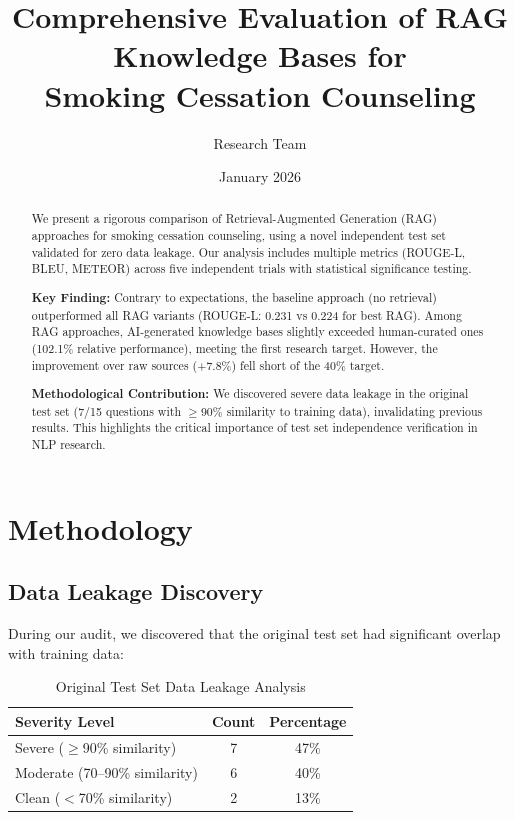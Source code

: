 \documentclass{article}
\title{Comprehensive Evaluation of RAG Knowledge Bases for\\Smoking Cessation Counseling}
\author{Research Team}
\date{January 2026}
\begin{document}
\maketitle

\begin{abstract}
We present a rigorous comparison of Retrieval-Augmented Generation (RAG) approaches for smoking cessation counseling, using a novel independent test set validated for zero data leakage. Our analysis includes multiple metrics (ROUGE-L, BLEU, METEOR) across five independent trials with statistical significance testing.

\textbf{Key Finding:} Contrary to expectations, the baseline approach (no retrieval) outperformed all RAG variants (ROUGE-L: 0.231 vs 0.224 for best RAG). Among RAG approaches, AI-generated knowledge bases slightly exceeded human-curated ones (102.1\% relative performance), meeting the first research target. However, the improvement over raw sources (+7.8\%) fell short of the 40\% target.

\textbf{Methodological Contribution:} We discovered severe data leakage in the original test set (7/15 questions with $\geq$90\% similarity to training data), invalidating previous results. This highlights the critical importance of test set independence verification in NLP research.
\end{abstract}

\section{Methodology}

\subsection{Data Leakage Discovery}
During our audit, we discovered that the original test set had significant overlap with training data:

\begin{table}[h]
\centering
\caption{Original Test Set Data Leakage Analysis}
\begin{tabular}{lcc}
\toprule
Severity Level & Count & Percentage \\
\midrule
Severe ($\geq$90\% similarity) & 7 & 47\% \\
Moderate (70--90\% similarity) & 6 & 40\% \\
Clean ($<$70\% similarity) & 2 & 13\% \\
\bottomrule
\end{tabular}
\label{tab:leakage}
\end{table}
\end{document}

